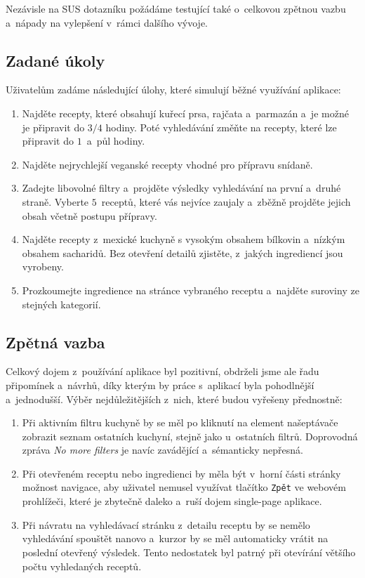 Nezávisle na SUS dotazníku požádáme testující také o~celkovou zpětnou vazbu a~nápady na vylepšení v~rámci dalšího vývoje.

\subsection{Zadané úkoly}

Uživatelům zadáme následující úlohy, které simulují běžné využívání aplikace:

\begin{enumerate}
    \item Najděte recepty, které obsahují kuřecí prsa, rajčata a~parmazán a~je možné je připravit do $3/4$ hodiny. Poté vyhledávání změňte na recepty, které lze připravit do $1$~a~půl hodiny.
    \item Najděte nejrychlejší veganské recepty vhodné pro přípravu snídaně.
    \item Zadejte libovolné filtry a~projděte výsledky vyhledávání na první a~druhé straně. Vyberte $5$~receptů, které vás nejvíce zaujaly a~zběžně projděte jejich obsah včetně postupu přípravy.
    \item Najděte recepty z~mexické kuchyně s vysokým obsahem bílkovin a~nízkým obsahem sacharidů. Bez otevření detailů zjistěte, z~jakých ingrediencí jsou vyrobeny.
    \item Prozkoumejte ingredience na stránce vybraného receptu a~najděte suroviny ze stejných kategorií.
\end{enumerate}

\subsection{Zpětná vazba}

Celkový dojem z~používání aplikace byl pozitivní, obdrželi jsme ale řadu připomínek a~návrhů, díky kterým by práce s~aplikací byla pohodlnější a~jednodušší. Výběr nejdůležitějších z~nich, které budou vyřešeny přednostně:

\begin{enumerate}
    \item Při aktivním filtru kuchyně by se měl po kliknutí na element našeptávače zobrazit seznam ostatních kuchyní, stejně jako u~ostatních filtrů. Doprovodná zpráva \emph{No more filters} je navíc zavádějící a~sémanticky nepřesná.
    \item Při otevřeném receptu nebo ingredienci by měla být v~horní části stránky možnost navigace, aby uživatel nemusel využívat tlačítko \texttt{Zpět} ve webovém prohlížeči, které je zbytečně daleko a~ruší dojem single-page aplikace.
    \item Při návratu na vyhledávací stránku z~detailu receptu by se nemělo vyhledávání spouštět nanovo a~kurzor by se měl automaticky vrátit na poslední otevřený výsledek. Tento nedostatek byl patrný při otevírání většího počtu vyhledaných receptů.
\end{enumerate}

